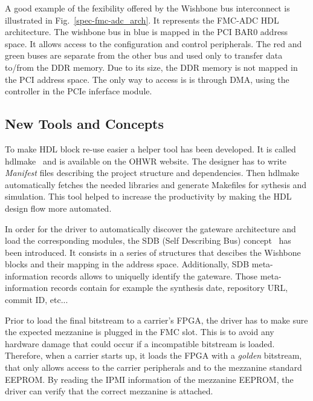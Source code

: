 \documentclass{JAC2003}
\begin{document}
A good example of the fexibility offered by the Wishbone bus interconnect is illustrated in Fig.~\ref{spec-fmc-adc_arch}.
It represents the FMC-ADC HDL architecture.
The wishbone bus in blue is mapped in the PCI BAR0 address space.
It allows access to the configuration and control peripherals.
The red and green buses are separate from the other bus and used only to transfer data to/from the DDR memory.
Due to its size, the DDR memory is not mapped in the PCI address space.
The only way to access is is through DMA, using the controller in the PCIe inferface module.

\subsection{New Tools and Concepts}

To make HDL block re-use easier a helper tool has been developed.
It is called hdlmake~\cite{hdlmake} and is available on the OHWR website.
The designer has to write \textit{Manifest} files describing the project structure and dependencies.
Then hdlmake automatically fetches the needed libraries and generate Makefiles for sythesis and simulation.
This tool helped to increase the productivity by making the HDL design flow more automated.

In order for the driver to automatically discover the gateware architecture and load the corresponding modules, the SDB (Self Describing Bus) concept~\cite{sdb} has been introduced.
It consists in a series of structures that descibes the Wishbone blocks and their mapping in the address space.
Additionally, SDB meta-information records allows to uniquelly identify the gateware.
Those meta-information records contain for example the synthesis date, repository URL, commit ID, etc...

Prior to load the final bitstream to a carrier's FPGA, the driver has to make sure the expected mezzanine is plugged in the FMC slot.
This is to avoid any hardware damage that could occur if a incompatible bitstream is loaded.
Therefore, when a carrier starts up, it loads the FPGA with a \textit{golden} bitstream, that only allows access to the carrier peripherals and to the mezzanine standard EEPROM.
By reading the IPMI information of the mezzanine EEPROM, the driver can verify that the correct mezzanine is attached.
\end{document}
